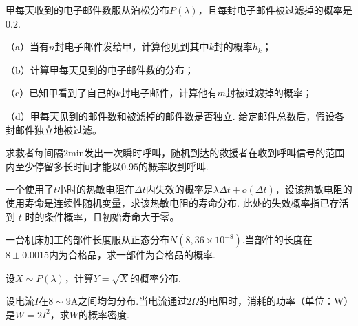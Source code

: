\begin{exercise}[泊松分裂与独立性]\label{q:Y3.9}
甲每天收到的电子邮件数服从泊松分布$P(\lambda)$，且每封电子邮件被过滤掉的概率是$0.2$.

（a）当有$n$封电子邮件发给甲，计算他见到其中$k$封的概率$h_k$；

（b）计算甲每天见到的电子邮件数的分布；

（c）已知甲看到了自己的$k$封电子邮件，计算他有$m$封被过滤掉的概率；

（d）甲每天见到的邮件数和被滤掉的邮件数是否独立. 给定邮件总数后，假设各封邮件独立地被过滤。\par{}\end{exercise}

\begin{exercise}[周期信号的均匀等待]\label{q:Y3.13}
求救者每间隔$2$min发出一次瞬时呼叫，随机到达的救援者在收到呼叫信号的范围内至少停留多长时间才能以$0.95$的概率收到呼叫.\par{}\end{exercise}

\begin{exercise}[恒定风险率与指数寿命]\label{q:Y3.14}
一个使用了$t$小时的热敏电阻在$\Delta t$内失效的概率是$\lambda \Delta t+o(\Delta t)$，设该热敏电阻的使用寿命是连续性随机变量，求该热敏电阻的寿命分布. 此处的失效概率指已存活到 $t$ 时的条件概率，且初始寿命大于零。\par{}\end{exercise}

\begin{exercise}[正态尺寸的合格概率]\label{q:Y3.15}
一台机床加工的部件长度服从正态分布$N(8,36\times 10^{-8})$.当部件的长度在$8\pm 0.0015$内为合格品，求一部件为合格品的概率.\par{}\end{exercise}

\begin{exercise}[泊松变量的平方根]\label{q:Y3.16}
设$X\sim P(\lambda)$，计算$Y=\sqrt{X}$的概率分布.\par{}\end{exercise}

\begin{exercise}[均匀电流的平方变换]\label{q:Y3.17}
设电流$I$在$8\sim 9$A之间均匀分布.当电流通过$2\Omega$的电阻时，消耗的功率（单位：W）是$W=2I^2$，求$W$的概率密度.\par{}\end{exercise}

